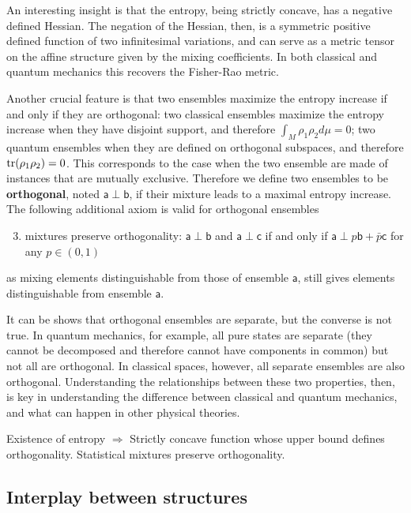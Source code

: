 \documentclass[10pt,twocolumn, nofootinbib]{revtex4-2}
\newcommand{\ens}[1][e] {\mathsf{#1}} %
\def\ortho{\perp}
\begin{document}
An interesting insight is that the entropy, being strictly concave, has a negative defined Hessian. The negation of the Hessian, then, is a symmetric positive defined function of two infinitesimal variations, and can serve as a metric tensor on the affine structure given by the mixing coefficients. In both classical and quantum mechanics this recovers the Fisher-Rao metric.

Another crucial feature is that two ensembles maximize the entropy increase if and only if they are orthogonal: two classical ensembles maximize the entropy increase when they have disjoint support, and therefore $\int_M \rho_1 \rho_2 d\mu = 0$; two quantum ensembles when they are defined on orthogonal subspaces, and therefore $\operatorname{tr}(\rho_1 \rho_2) = 0$. This corresponds to the case when the two ensemble are made of instances that are mutually exclusive. Therefore we define two ensembles to be \textbf{orthogonal}, noted $\ens[a] \ortho \ens[b]$, if their mixture leads to a maximal entropy increase. The following additional axiom is valid for orthogonal ensembles
\begin{enumerate}
	\setcounter{enumi}{2}
	\item mixtures preserve orthogonality: $\ens[a] \ortho \ens[b]$ and $\ens[a] \ortho \ens[c]$ if and only if $\ens[a] \ortho p \ens[b] + \bar{p} \ens[c]$ for any $p \in (0,1)$
\end{enumerate}
as mixing elements distinguishable from those of ensemble $\ens[a]$, still gives elements distinguishable from ensemble $\ens[a]$.

It can be shows that orthogonal ensembles are separate, but the converse is not true. In quantum mechanics, for example, all pure states are separate (they cannot be decomposed and therefore cannot have components in common) but not all are orthogonal. In classical spaces, however, all separate ensembles are also orthogonal. Understanding the relationships between these two properties, then, is key in understanding the difference between classical and quantum mechanics, and what can happen in other physical theories.

\begin{tcolorbox}[colback=white, colframe=black]
	Existence of entropy $\Rightarrow$ Strictly concave function whose upper bound defines orthogonality. Statistical mixtures preserve orthogonality.
\end{tcolorbox}

\subsection{Interplay between structures}
\end{document}
